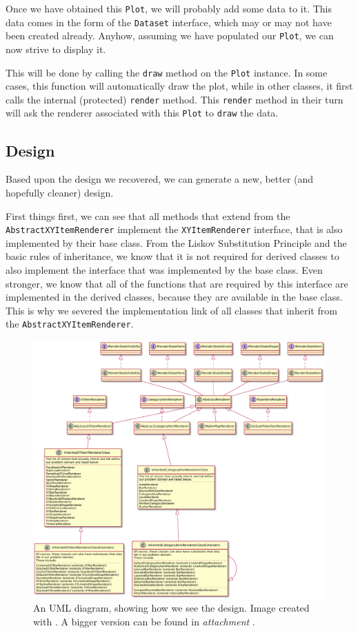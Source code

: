 \documentclass[11pt]{article}
\begin{document}
	Once we have obtained this \texttt{Plot}, we will probably add some data to it. This data comes in the form of the \texttt{Dataset} interface, which may or may not have been created already. Anyhow, assuming we have populated our \texttt{Plot}, we can now strive to display it.
	
	This will be done by calling the \texttt{draw} method on the \texttt{Plot} instance. In some cases, this function will automatically draw the plot, while in other classes, it first calls the internal (protected) \texttt{render} method. This \texttt{render} method in their turn will ask the renderer associated with this \texttt{Plot} to \texttt{draw} the data.

	\subsection{Design}
	\label{sec:design}
	Based upon the design we recovered, we can generate a new, better (and hopefully cleaner) design.
	
	First things first, we can see that all methods that extend from the \texttt{AbstractXYItemRenderer} implement the \texttt{XYItemRenderer} interface, that is also implemented by their base class. From the \textsf{Liskov Substitution Principle} \cite{Liskov94abehavioral} and the basic rules of inheritance, we know that it is not required for derived classes to also implement the interface that was implemented by the base class. Even stronger, we know that all of the functions that are required by this interface are implemented in the derived classes, because they are available in the base class. This is why we severed the implementation link of all classes that inherit from the \texttt{AbstractXYItemRenderer}.
	
	\begin{figure}[H]
		\centering
		\includegraphics[width=\textwidth]{pictures/class-diagram-ours.pdf}
		\caption{An UML diagram, showing how we see the design. Image created with \cite{plantuml}. A bigger version can be found in \textsl{attachment \pageref{class-diagram-ours}}.}
		\label{fig:UML-ours}
	\end{figure}
	
\end{document}
